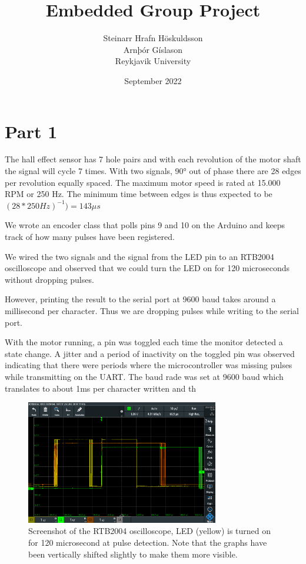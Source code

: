\documentclass{article}
\title{Embedded Group Project}
\author{Steinarr Hrafn Höskuldsson\\
Arnþór Gíslason\\
Reykjavik University}
\date{September 2022}
\begin{document}
\maketitle

\section*{Part 1}
The hall effect sensor has 7 hole pairs and with each revolution of the motor shaft the signal will cycle 7 times. With two signals, 90° out of phase there are 28 edges per revolution equally spaced. The maximum motor speed is rated at 15.000 RPM or 250 Hz. The minimum time between edges is thus expected to be \((28*250Hz)^{-1}) = 143 \mu s\)

We wrote an encoder class that polls pins 9 and 10 on the Arduino and keeps track of how many pulses have been registered. 

We wired the two signals and the signal from the LED pin to an RTB2004 oscilloscope and observed that we could turn the LED on for 120 microseconds without dropping pulses. 


However, printing the result to the serial port at 9600 baud takes around a millisecond per character. Thus we are dropping pulses while writing to the serial port.


With the motor running, a pin was toggled each time the monitor detected a state change. A jitter and a period of inactivity on the toggled pin was observed indicating that there were periods where the microcontroller was missing pulses while transmitting on the UART. The baud rade was set at 9600 baud which translates to about 1ms per character written and th

\begin{figure}[h]
    \centering
    \includegraphics[width=0.75\textwidth]{Project1RotaryEncoder/oscilloscope_part1_120ms.PNG}
    \caption{Screenshot of the RTB2004 oscilloscope, LED (yellow) is turned on for 120 microsecond at pulse detection. Note that the graphs have been vertically shifted slightly to make them more visible.}
    \label{fig:osc120}
\end{figure}
\end{document}
